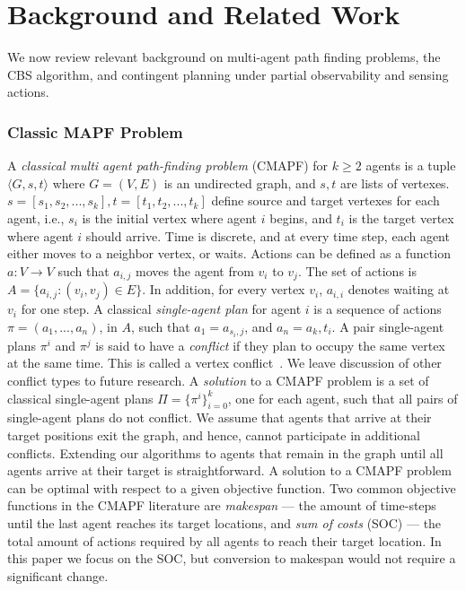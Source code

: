 \documentclass[letterpaper]{article} %
\begin{document}
\section{Background and Related Work}
We now review relevant background on multi-agent path finding problems, the CBS algorithm, and contingent planning under partial observability and sensing actions.
\subsubsection{Classic MAPF Problem}
A \emph{classical multi agent path-finding problem} (CMAPF) \cite[e.g.][]{stern2019multi} for $k \geq 2$ agents is a tuple $\langle G,s,t \rangle$
where $G = (V, E)$ is an undirected graph, and $s,t$ are lists of vertexes. $s = [s_1, s_2, ..., s_k], t = [t_1, t_2, ..., t_k]$ define source and target vertexes for each agent, i.e., $s_i$ is the initial vertex where agent $i$ begins, and $t_i$ is the target vertex where agent $i$ should arrive.
Time is discrete, and at every time step, each
agent either moves to a neighbor vertex, or waits. Actions can be defined as a function $a : V \rightarrow V$ such that $a_{i,j}$ moves the agent from $v_i$ to $v_j$. The set of actions is $A=\{a_{i,j}:(v_i, v_j) \in E\}$. In addition, for every vertex $v_i$, $a_{i,i}$ denotes waiting at $v_i$ for one step.
A classical \emph{single-agent plan} for agent $i$ is a sequence of actions $\pi = (a_1, . . ., a_n)$, in $A$, such that $a_1=a_{s_i,j}$, and $a_n=a_k,t_i$.
A pair single-agent plans $\pi^i$ and $\pi^j$ is said to have a \emph{conflict} if they plan to occupy the same vertex at the same time. This is called a vertex conflict~\cite{stern2019multi}. We leave discussion of other conflict types to future research.
A \emph{solution} to a CMAPF problem is a set of classical single-agent plans $\Pi = \{ \pi^i \}_{i=0}^k $, one for each agent, such that all pairs of single-agent plans do not conflict.
We assume that agents that arrive at their target positions exit the graph, and hence, cannot participate in additional conflicts. Extending our algorithms to agents that remain in the graph until all agents arrive at their target is straightforward.
A solution to a CMAPF problem can be optimal with respect to a given objective function.
Two common objective functions in the CMAPF literature are \emph{makespan} --- the amount of time-steps until
the last agent reaches its target locations, and \emph{sum of costs} (SOC) --- the total amount of actions required by all agents to reach their target location. In this paper we focus on the SOC, but conversion to makespan would not require a significant change.
\end{document}
